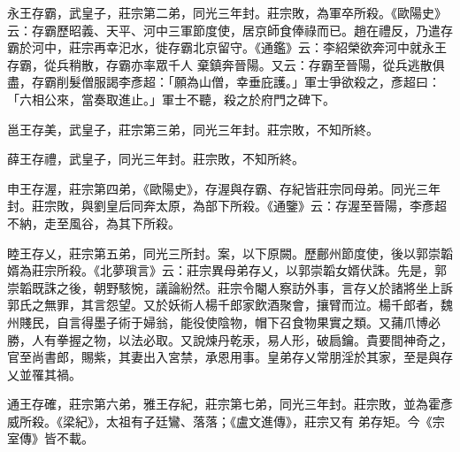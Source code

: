 
\begin{pinyinscope}

 永王存霸，武皇子，莊宗第二弟，同光三年封。莊宗敗，為軍卒所殺。《歐陽史》云：存霸歷昭義、天平、河中三軍節度使，居京師食俸祿而已。趙在禮反，乃遣存霸於河中，莊宗再幸汜水，徙存霸北京留守。《通鑑》云：李紹榮欲奔河中就永王存霸，從兵稍散，存霸亦率眾千人
 棄鎮奔晉陽。又云：存霸至晉陽，從兵逃散俱盡，存霸削髮僧服謁李彥超：「願為山僧，幸垂庇護。」軍士爭欲殺之，彥超曰：「六相公來，當奏取進止。」軍士不聽，殺之於府門之碑下。


邕王存美，武皇子，莊宗第三弟，同光三年封。莊宗敗，不知所終。



 薛王存禮，武皇子，同光三年封。莊宗敗，不知所終。



 申王存渥，莊宗第四弟，《歐陽史》，存渥與存霸、存紀皆莊宗同母弟。同光三年封。莊宗敗，與劉皇后同奔太原，為部下所殺。《通鑒》云：存渥至晉陽，李彥超不納，走至風谷，為其下所殺。



 睦王存乂，莊宗第五弟，同光三所封。案，以下原闕。歷鄜州節度使，後以郭崇韜婿為莊宗所殺。《北夢瑣言》云：莊宗異母弟存乂，以郭崇韜女婿伏誅。先是，郭崇韜既誅之後，朝野駭惋，議論紛然。莊宗令閹人察訪外事，言存乂於諸將坐上訴郭氏之無罪，其言怨望。又於妖術人楊千郎家飲酒聚會，攘臂而泣。楊千郎者，魏州賤民，自言得墨子術于婦翁，能役使陰物，帽下召食物果實之類。又蒱爪博必勝，人有拳握之物，以法必取。又說煉丹乾汞，易人形，破扃鑰。貴要間神奇之，官至尚書郎，賜紫，其妻出入宮禁，承恩用事。皇弟存乂常朋淫於其家，至是與存乂並罹其禍。



 通王存確，莊宗第六弟，雅王存紀，莊宗第七弟，同光三年封。莊宗敗，並為霍彥威所殺。《梁紀》，太祖有子廷鸞、落落；《盧文進傳》，莊宗又有
 弟存矩。今《宗室傳》皆不載。




\end{pinyinscope}
